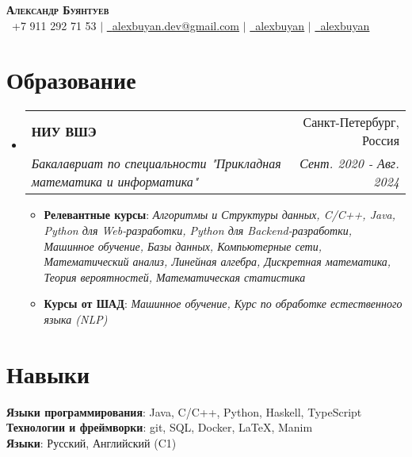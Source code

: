 \documentclass[english,russian,letterpaper,11pt]{article}
\makeatletter
\newcommand{\resumeItem}[1]{
  \item\small{
    {#1 \vspace{-2pt}}
  }
}
\newcommand{\resumeSubheading}[4]{
  \vspace{-2pt}\item
    \begin{tabular*}{0.97\textwidth}[t]{l@{\extracolsep{\fill}}r}
      \textbf{#1} & #2 \\
      \textit{\small#3} & \textit{\small #4} \\
    \end{tabular*}\vspace{-7pt}
}
\newcommand{\resumeSubHeadingListStart}{\begin{itemize}[leftmargin=0.15in, label={}]}
\newcommand{\resumeSubHeadingListEnd}{\end{itemize}}
\newcommand{\resumeItemListStart}{\begin{itemize}}
\newcommand{\resumeItemListEnd}{\end{itemize}\vspace{-5pt}}
\makeatother
\begin{document}

\begin{center}
    \textbf{\Huge \scshape Александр Буянтуев} \\ \vspace{2pt}
    \small \faPhone \ +7 911 292 71 53 $|$ \href{mailto:alexbuyan.dev@gmail.com}{\faEnvelope \ \underline{alexbuyan.dev@gmail.com}} $|$ 
    \href{https://github.com/alexbuyan}{\faGithub \ \underline{alexbuyan}} $|$ \href{https://www.linkedin.com/in/alexander-buyantuev-063785223}{\faLinkedin \ \underline{alexbuyan}}
\end{center}


\section{Образование}
  \resumeSubHeadingListStart
    \resumeSubheading
      {НИУ ВШЭ}{Санкт-Петербург, Россия}
      {Бакалавриат по специальности "Прикладная математика и информатика"}{Сент. 2020 - Авг. 2024}
      \resumeItemListStart
        \resumeItem{\textbf{Релевантные курсы}: \textit{Алгоритмы и Структуры данных, C/C++, Java, Python для Web-разработки, Python для Backend-разработки, Машинное обучение, Базы данных, Компьютерные сети, Математический анализ, Линейная алгебра, Дискретная математика, Теория вероятностей, Математическая статистика}}
        \resumeItem{\textbf{Курсы от ШАД}: \textit{Машинное обучение, Курс по обработке естественного языка (NLP)}}
      \resumeItemListEnd
  \resumeSubHeadingListEnd

\section{Навыки}
 \begin{itemize}[leftmargin=0.15in, label={}]
    \small{\item{
     \textbf{Языки программирования}{: Java, C/C++, Python, Haskell, TypeScript} \\
     \textbf{Технологии и фреймворки}{: git, SQL, Docker, \LaTeX, Manim} \\
     \textbf{Языки}{: Русский, Английский (C1)} \\
    }}
 \end{itemize}
\end{document}
